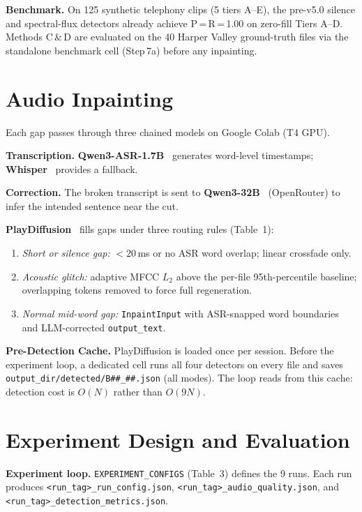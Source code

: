 \documentclass[9pt,twocolumn]{article}
\begin{document}
\noindent\textbf{Benchmark.}
On 125 synthetic telephony clips (5 tiers A--E), the pre-v5.0 silence
and spectral-flux detectors already achieve P\,=\,R\,=\,1.00 on
zero-fill Tiers A--D.  Methods C\,\&\,D are evaluated on the 40 Harper
Valley ground-truth files via the standalone benchmark cell (Step\,7a)
before any inpainting.

\section{Audio Inpainting}
\label{sec:inpainting}

Each gap passes through three chained models on Google Colab (T4 GPU).

\noindent\textbf{Transcription.}
\textbf{Qwen3-ASR-1.7B}~\cite{qwen3} generates word-level timestamps;
\textbf{Whisper}~\cite{whisper} provides a fallback.

\noindent\textbf{Correction.}
The broken transcript is sent to \textbf{Qwen3-32B}~\cite{qwen3}
(OpenRouter) to infer the intended sentence near the cut.

\noindent\textbf{PlayDiffusion}~\cite{playdiffusion} fills gaps under
three routing rules (Table~1):
\begin{enumerate}[label=(\roman*)]
\item \emph{Short or silence gap:} ${<}20$\,ms or no ASR word overlap;
  linear crossfade only.
\item \emph{Acoustic glitch:} adaptive MFCC $L_2$ above the per-file
  95th-percentile baseline; overlapping tokens removed to force
  full regeneration.
\item \emph{Normal mid-word gap:} \texttt{InpaintInput} with ASR-snapped
  word boundaries and LLM-corrected \texttt{output\_text}.
\end{enumerate}

\noindent\textbf{Pre-Detection Cache.}
PlayDiffusion is loaded once per session.  Before the experiment loop,
a dedicated cell runs all four detectors on every file and saves
\texttt{output\_dir/detected/B\#\#\_\#\#.json} (all modes).  The loop
reads from this cache: detection cost is $O(N)$ rather than $O(9N)$.

\section{Experiment Design and Evaluation}
\label{sec:eval}

\noindent\textbf{Experiment loop.}
\texttt{EXPERIMENT\_CONFIGS} (Table~3) defines the 9 runs.
Each run produces \texttt{<run\_tag>\_run\_config.json},
\texttt{<run\_tag>\_audio\_quality.json}, and
\texttt{<run\_tag>\_detection\_metrics.json}.
\end{document}
